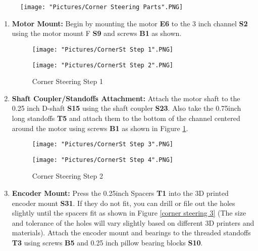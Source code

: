 \documentclass[12pt]{article}
\begin{document}
\begin{figure}[H]
	\centering
	\texttt{[image: "Pictures/Corner Steering Parts".PNG]}
\end{figure}


\begin{enumerate}
\item \textbf{Motor Mount:} Begin by mounting the motor \textbf{E6} to the 3 inch channel \textbf{S2} using the motor mount F \textbf{S9} and screws \textbf{B1} as shown. 

\begin{figure}[H]
  \centering
  \begin{minipage}[b]{0.45\textwidth}
    \texttt{[image: "Pictures/CornerSt Step 1".PNG]}
  \end{minipage}
  \hfill
  \begin{minipage}[b]{0.45\textwidth}
    \texttt{[image: "Pictures/CornerSt Step 2".PNG]}
  \end{minipage}
  \caption{Corner Steering Step 1}
\end{figure}

\item \textbf{Shaft Coupler/Standoffs Attachment:} Attach the motor shaft to the 0.25 inch D-shaft \textbf{S15} using the shaft coupler \textbf{S23}. Also take the 0.75inch long standoffs \textbf{T5} and attach them to the bottom of the channel centered around the motor using screws \textbf{B1} as shown in Figure \ref{corner steering 2}. 

\begin{figure}[H]
  \centering
  \begin{minipage}[b]{0.45\textwidth}
    \texttt{[image: "Pictures/CornerSt Step 3".PNG]}
  \end{minipage}
  \hfill
  \begin{minipage}[b]{0.45\textwidth}
    \texttt{[image: "Pictures/CornerSt Step 4".PNG]}
  \end{minipage}
  \caption{Corner Steering Step 2}
  \label{corner steering 2}
\end{figure}

\item \textbf{Encoder Mount:} Press the 0.25inch Spacers \textbf{T1} into the 3D printed encoder mount \textbf{S31}. If they do not fit, you can drill or file out the holes slightly until the spacers fit as shown in Figure \ref{corner steering 3} (The size and tolerance of the holes will vary slightly based on different 3D printers and materials). Attach the encoder mount and bearings to the threaded standoffs \textbf{T3} using screws \textbf{B5} and 0.25 inch pillow bearing blocks \textbf{S10}.


\end{enumerate}
\end{document}
